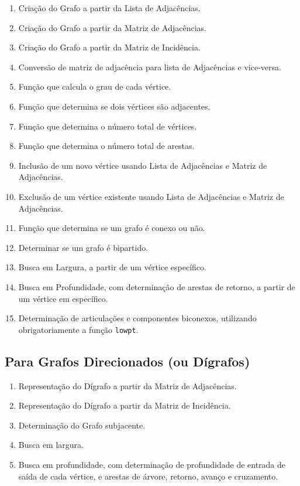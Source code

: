\begin{enumerate}
  \item Criação do Grafo a partir da Lista de Adjacências.
  \item Criação do Grafo a partir da Matriz de Adjacências.
  \item Criação do Grafo a partir da Matriz de Incidência.
  \item Conversão de matriz de adjacência para lista de Adjacências e
    vice-versa.
  \item Função que calcula o grau de cada vértice.
  \item Função que determina se dois vértices são adjacentes.
  \item Função que determina o número total de vértices.
  \item Função que determina o número total de arestas.
  \item Inclusão de um novo vértice usando Lista de Adjacências e
    Matriz de Adjacências.
  \item Exclusão de um vértice existente usando Lista de Adjacências
    e Matriz de Adjacências.
  \item Função que determina se um grafo é conexo ou não.
  \item Determinar se um grafo é bipartido.
  \item \label{item:bfs1} Busca em Largura, a partir de um vértice específico.
  \item \label{item:dfs1} Busca em Profundidade, com determinação de arestas de
    retorno, a partir de um vértice em específico.
  \item \label{item:biconnect} Determinação de articulações e
    componentes biconexos, utilizando obrigatoriamente a função \texttt{lowpt}.
\end{enumerate}

\subsection{Para Grafos Direcionados (ou Dígrafos)}

\begin{enumerate}[resume]
  \item Representação do Dígrafo a partir da Matriz de Adjacências.
  \item Representação do Dígrafo a partir da Matriz de Incidência.
  \item Determinação do Grafo subjacente.
  \item \label{item:bfs2} Busca em largura.
  \item \label{item:dfs2} Busca em profundidade, com determinação de
    profundidade de entrada de saída de cada vértice, e arestas de
    árvore, retorno, avanço e cruzamento.
\end{enumerate}

